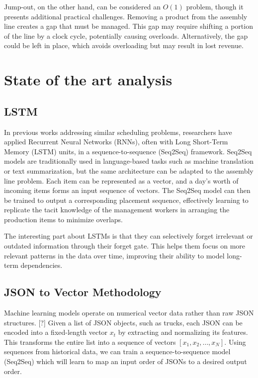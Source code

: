 \documentclass[12pt,a4paper]{report}
\begin{document}
Jump-out, on the other hand, can be considered an $O(1)$ problem, though it presents additional practical challenges. Removing a product from the assembly line creates a gap that must be managed. This gap may require shifting a portion of the line by a clock cycle, potentially causing overloads. Alternatively, the gap could be left in place, which avoids overloading but may result in lost revenue.

\chapter{State of the art analysis}
\section{LSTM}

In previous works addressing similar scheduling problems, researchers have applied Recurrent Neural Networks (RNNs), often with Long Short-Term Memory (LSTM) units, in a sequence-to-sequence (Seq2Seq) framework. Seq2Seq models are traditionally used in language-based tasks such as machine translation or text summarization, but the same architecture can be adapted to the assembly line problem.\cite{ref2} Each item can be represented as a vector, and a day’s worth of incoming items forms an input sequence of vectors. The Seq2Seq model can then be trained to output a corresponding placement sequence, effectively learning to replicate the tacit knowledge of the management workers in arranging the production items to minimize overlaps.\cite{ref3} 

The interesting part about LSTMs is that they can selectively forget irrelevant or outdated information through their forget gate. This helps them focus on more relevant patterns in the data over time, improving their ability to model long-term dependencies. \cite{ref4}

\section{JSON to Vector Methodology}
Machine learning models operate on numerical vector data rather than raw JSON structures. [?] Given a list of JSON objects, such as trucks, each JSON can be encoded into a fixed-length vector $x_t$ by extracting and normalizing its features. This transforms the entire list into a sequence of vectors ${[x_1, x_2, \dots, x_N]}$. Using sequences from historical data, we can train a sequence-to-sequence model (Seq2Seq) which will learn to map an input order of JSONs to a desired output order. 
\end{document}
